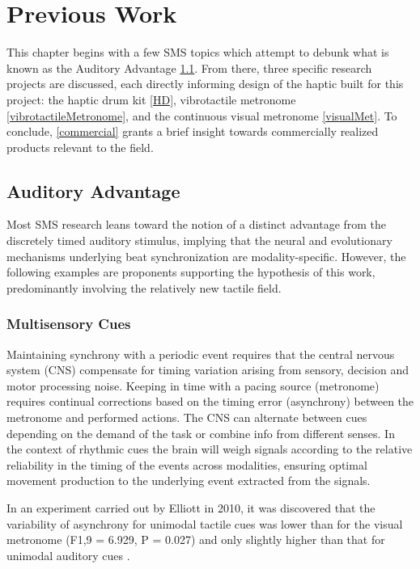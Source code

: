 \chapter{Previous Work}

This chapter begins with a few SMS topics which attempt to debunk what is known as the Auditory Advantage \ref{AudAdv}. From there, three specific research projects are discussed, each directly informing design of the haptic built for this project: the haptic drum kit \ref{HD}, vibrotactile metronome \ref{vibrotactileMetronome}, and the continuous visual metronome \ref{visualMet}. To conclude, \ref{commercial} grants a brief insight towards commercially realized products relevant to the field.

\section{Auditory Advantage} \label{AudAdv}
Most SMS research leans toward the notion of a distinct advantage from the discretely timed auditory stimulus, implying that the neural and evolutionary mechanisms underlying beat synchronization are modality-specific. However, the following examples are proponents supporting the hypothesis of this work, predominantly involving the relatively new tactile field.

\subsection{Multisensory Cues}
Maintaining synchrony with a periodic event requires that the central nervous system (CNS) compensate for timing variation arising from sensory, decision and motor processing noise. Keeping in time with a pacing source (metronome) requires continual corrections based on the timing error (asynchrony) between the metronome and performed actions. The CNS can alternate between cues depending on the demand of the task or combine info from different senses. In the context of rhythmic cues the brain will weigh signals according to the relative reliability in the timing of the events across modalities, ensuring optimal movement production to the underlying event extracted from the signals. 

In an experiment carried out by Elliott in 2010, it was discovered that the variability of asynchrony for unimodal tactile cues was lower than for the visual metronome (F1,9 = 6.929, P = 0.027) and only slightly higher than that for unimodal auditory cues \cite{elliott2010multisensory}.

